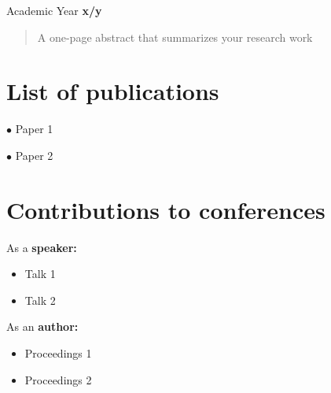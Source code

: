 \documentclass{report}
\newcommand{\alert}[1]{{\color{red} #1}}
\begin{document}
\begin{flushright}
\LARGE{Academic Year \alert{\textbf{x/y}}}
\end{flushright}
\begin{abstract}
   A one-page  abstract that summarizes
   your research work	
\end{abstract}


\section*{List of publications}
$\bullet$ Paper 1 \cite{yourpaper1}

$\bullet$ Paper 2

\section*{Contributions to conferences}
As a \textbf{speaker:}
\begin{itemize}
	\item Talk 1 
	\item Talk 2 
\end{itemize}
As an \textbf{author:}
\begin{itemize}
    \item Proceedings 1 
    \item Proceedings 2
\end{itemize}
\tableofcontents
\pagestyle{mystyle}










\appendix


\printbibliography


\end{document}
